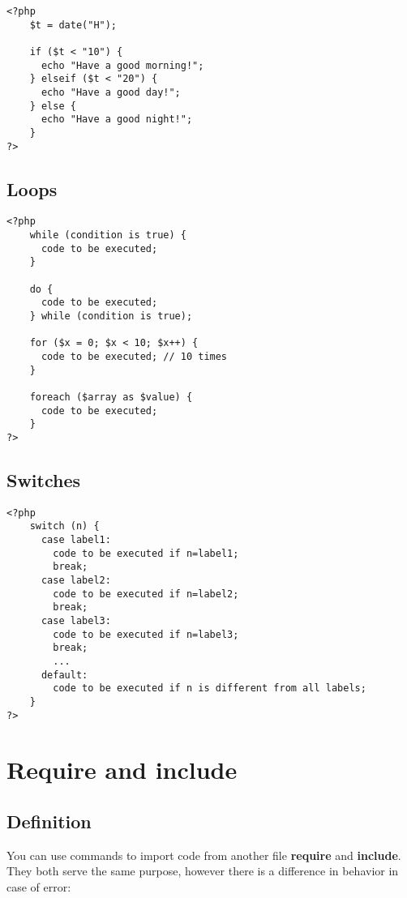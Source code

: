 \documentclass[a4paper]{article}
\begin{document}
\begin{lstlisting}
<?php
    $t = date("H");
    
    if ($t < "10") {
      echo "Have a good morning!";
    } elseif ($t < "20") {
      echo "Have a good day!";
    } else {
      echo "Have a good night!";
    }
?>
\end{lstlisting}

\subsection{Loops}

\begin{lstlisting}
<?php
    while (condition is true) {
      code to be executed;
    }
    
    do {
      code to be executed;
    } while (condition is true);
    
    for ($x = 0; $x < 10; $x++) {
      code to be executed; // 10 times
    }
    
    foreach ($array as $value) {
      code to be executed;
    }
?>
\end{lstlisting}

\subsection{Switches}

\begin{lstlisting}
<?php
    switch (n) {
      case label1:
        code to be executed if n=label1;
        break;
      case label2:
        code to be executed if n=label2;
        break;
      case label3:
        code to be executed if n=label3;
        break;
        ...
      default:
        code to be executed if n is different from all labels;
    }
?>
\end{lstlisting}

\pagebreak

\section{Require and include}

\subsection{Definition}

You can use commands to import code from another file
\textbf{require} and \textbf{include}. They both serve the same purpose, however
there is a difference in behavior in case of error:
\end{document}
